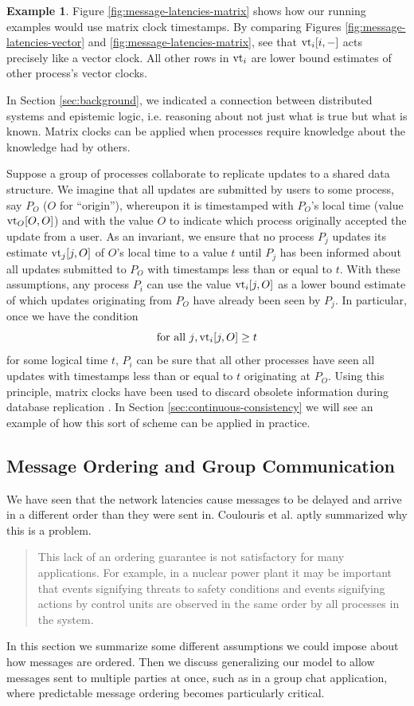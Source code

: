 \documentclass[]             %
{NASA}                       %
\theoremstyle{definition}
\newtheorem{example}{Example}[section]
\begin{document}
\begin{example}
  Figure \ref{fig:message-latencies-matrix} shows how our running
  examples would use matrix clock timestamps. By comparing Figures
  \ref{fig:message-latencies-vector} and
  \ref{fig:message-latencies-matrix}, see that $\textrm{vt}_i[i,-]$ acts
  precisely like a vector clock. All other rows in $\textrm{vt}_i$ are lower
  bound estimates of other process's vector clocks.
\end{example}

In Section \ref{sec:background}, we indicated a connection between
distributed systems and epistemic logic, i.e. reasoning about not just
what is true but what is known. Matrix clocks can be applied when
processes require knowledge about the knowledge had by others.

Suppose a group of processes collaborate to replicate updates to a
shared data structure. We imagine that all updates are submitted by
users to some process, say $P_O$ ($O$ for ``origin''), whereupon it is
timestamped with $P_O$'s local time (value $\textrm{vt}_O[O,O]$) and with the
value $O$ to indicate which process originally accepted the update
from a user. As an invariant, we ensure that no process $P_j$ updates
its estimate $\textrm{vt}_j[j, O]$ of $O$'s local time to a value $t$ until
$P_j$ has been informed about all updates submitted to $P_O$ with
timestamps less than or equal to $t$. With these assumptions, any
process $P_i$ can use the value $\textrm{vt}_i[j, O]$ as a lower bound
estimate of which updates originating from $P_O$ have already been
seen by $P_j$. In particular, once we have the
condition
\[ \textrm{for all $j$}, \textrm{vt}_i[j, O] \geq t
\]
for some logical time $t$, $P_i$ can be sure that all other processes
have seen all updates with timestamps less than or equal to $t$
originating at $P_O$. Using this principle, matrix clocks have been
used to discard obsolete information during database replication
\cite{1987:sarinlynch}. In Section \ref{sec:continuous-consistency} we
will see an example of how this sort of scheme can be applied in
practice.

\subsection{Message Ordering and Group Communication}
We have seen that the network latencies cause messages to be delayed
and arrive in a different order than they were sent in. Coulouris et
al. \cite{coulouris2005distributed} aptly summarized why this is a
problem.
\begin{quote}
  This lack of an ordering guarantee is not satisfactory for many
  applications. For example, in a nuclear power plant it may be
  important that events signifying threats to safety conditions and
  events signifying actions by control units are observed in the same
  order by all processes in the system.
\end{quote}
In this section we summarize some different assumptions we could
impose about how messages are ordered. Then we discuss generalizing
our model to allow messages sent to multiple parties at once, such as
in a group chat application, where predictable message ordering
becomes particularly critical.
\end{document}
